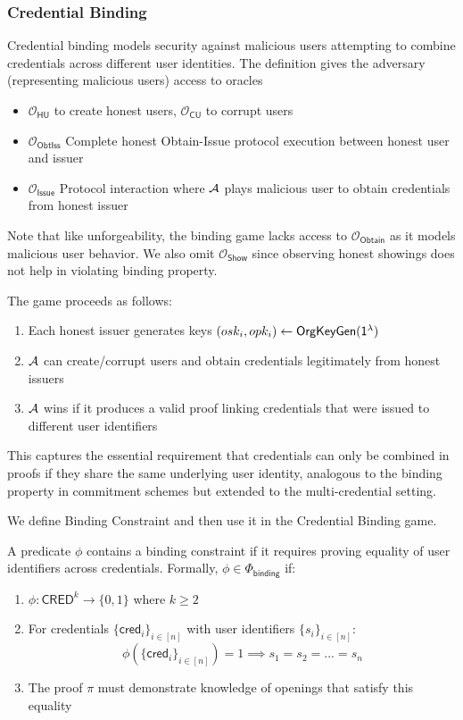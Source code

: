 \newpage
\subsubsection{Credential Binding}
Credential binding models security against malicious users attempting to combine credentials across different user identities. The definition gives the adversary (representing malicious users) access to oracles
\begin{itemize}
    \item $\mathcal{O}_{\mathsf{HU}}$ to create honest users, $\mathcal{O}_{\mathsf{CU}}$ to corrupt users
    \item $\mathcal{O}_{\mathsf{ObtIss}}$ Complete honest Obtain-Issue protocol execution between honest user and issuer
    \item $\mathcal{O}_{\mathsf{Issue}}$ Protocol interaction where $\mathcal{A}$ plays malicious user to obtain credentials from honest issuer
\end{itemize}
Note that like unforgeability, the binding game lacks access to $\mathcal{O}_{\mathsf{Obtain}}$ as it models malicious user behavior. We also omit $\mathcal{O}_{\mathsf{Show}}$ since observing honest showings does not help in violating binding property.

\noindent The game proceeds as follows:
\begin{enumerate}
    \item Each honest issuer generates keys $(osk_i, opk_i) \gets \mathsf{OrgKeyGen(\mathsf{1^{\lambda}})}$
    \item $\mathcal{A}$ can create/corrupt users and obtain credentials legitimately from honest issuers
    \item $\mathcal{A}$ wins if it produces a valid proof linking credentials that were issued to different user identifiers
\end{enumerate}
This captures the essential requirement that credentials can only be combined in proofs if they share the same underlying user identity, analogous to the binding property in commitment schemes but extended to the multi-credential setting.

We define Binding Constraint and then use it in the Credential Binding game. 
\begin{definition}
A predicate $\phi$ contains a binding constraint if it requires proving equality of user identifiers across credentials. Formally, $\phi \in \Phi_{\mathsf{binding}}$ if:
\begin{enumerate}
    \item $\phi: \mathsf{CRED}^k \rightarrow \{0,1\}$ where $k \geq 2$
    \item For credentials $\{\mathsf{cred}_i\}_{i \in [n]}$ with user identifiers $\{s_i\}_{i \in [n]}$:
        \[ \phi(\{\mathsf{cred}_i\}_{i \in [n]}) = 1 \implies s_1 = s_2 = ... = s_n \]
    \item The proof $\pi$ must demonstrate knowledge of openings that satisfy this equality
\end{enumerate}
\end{definition}

